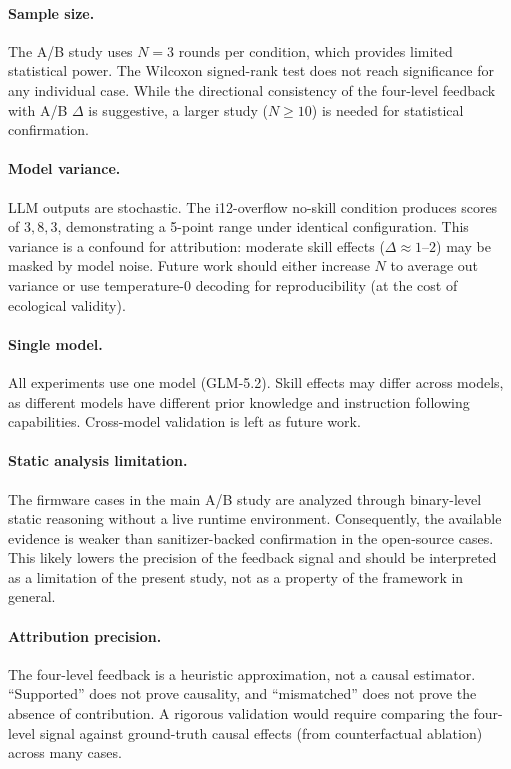 ﻿\documentclass[preprint,12pt]{elsarticle}
\begin{document}
\paragraph{Sample size.}
The A/B study uses $N=3$ rounds per condition, which provides limited
statistical power.  The Wilcoxon signed-rank test does not reach
significance for any individual case.  While the directional consistency
of the four-level feedback with A/B $\Delta$ is suggestive, a larger study
($N \geq 10$) is needed for statistical confirmation.

\paragraph{Model variance.}
LLM outputs are stochastic.  The i12-overflow no-skill condition produces
scores of $3, 8, 3$, demonstrating a 5-point range under identical
configuration.  This variance is a confound for attribution: moderate skill
effects ($\Delta \approx 1$--$2$) may be masked by model noise.  Future
work should either increase $N$ to average out variance or use
temperature-0 decoding for reproducibility (at the cost of ecological
validity).

\paragraph{Single model.}
All experiments use one model (GLM-5.2).  Skill effects may differ across
models, as different models have different prior knowledge and instruction
following capabilities.  Cross-model validation is left as future work.

\paragraph{Static analysis limitation.}
The firmware cases in the main A/B study are analyzed through binary-level
static reasoning without a live runtime environment.  Consequently, the
available evidence is weaker than sanitizer-backed confirmation in the
open-source cases.  This likely lowers the precision of the feedback signal
and should be interpreted as a limitation of the present study, not as a
property of the framework in general.

\paragraph{Attribution precision.}
The four-level feedback is a heuristic approximation, not a causal
estimator.  ``Supported'' does not prove causality, and ``mismatched''
does not prove the absence of contribution.  A rigorous validation would
require comparing the four-level signal against ground-truth causal
effects (from counterfactual ablation) across many cases.
\end{document}
